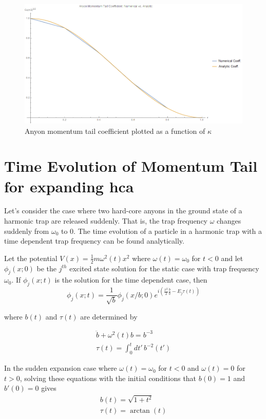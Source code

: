 \documentclass[onecolumn,english,aps,pra]{revtex4}
\begin{document}
\begin{center}
\begin{figure}[h]
	\includegraphics[scale=.5]{"../Plots/AnyonCoeff"}
	\caption{Anyon momentum tail coefficient plotted as a function of $\kappa$}
	\label{fig:AnyonCoeff}
\end{figure}
\end{center}

\section{Time Evolution of Momentum Tail for expanding hca}

Let's consider the case where two hard-core anyons in the ground state of a harmonic trap are released suddenly. That is, the trap frequency $\omega$ changes suddenly from $\omega_{0}$ to 0. The time evolution of a particle in a harmonic trap with a time dependent trap frequency can be found analytically. 

Let the potential $V(x) = \frac{1}{2} m \omega^2(t) x^2$ where $\omega(t) = \omega_0$ for $t < 0$ and let $\phi_j(x; 0)$ be the $j^{th}$ excited state solution for the static case with trap frequency $\omega_0$. If $\phi_j(x; t)$ is the solution for the time dependent case, then 
\[
\phi_j(x; t) = \frac{1}{\sqrt{b}}\phi_j(x/b; 0) e^{i (\frac{x^2}{2} \frac{\dot{b}}{b} - E_j \tau (t) ) }
\]

where $b(t)$ and $\tau(t)$ are determined by 

\begin{align*}
\ddot{b} + \omega^2(t) b = b^{-3}\\
\tau(t) = \int^{t}_{0}dt' \, b^{-2}(t')
\end{align*}

In the sudden expansion case where $\omega(t) = \omega_0$ for $t < 0$ and $\omega(t) = 0$ for $t > 0$, solving these equations with the initial conditions that $b(0) = 1$ and $b'(0) = 0$ gives
\begin{eqnarray}
b(t) = \sqrt{1 + t^2}\\
\tau(t) = \arctan(t)
\end{eqnarray}
\end{document}

